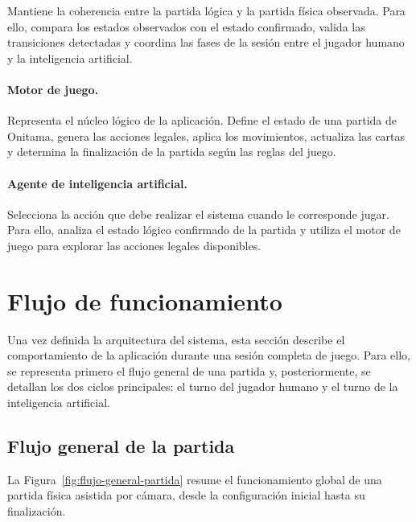 Mantiene la coherencia entre la partida lógica y la partida física observada. Para ello, compara los estados observados con el estado confirmado, valida las transiciones detectadas y coordina las fases de la sesión entre el jugador humano y la inteligencia artificial.

\paragraph{Motor de juego.}

Representa el núcleo lógico de la aplicación. Define el estado de una partida de Onitama, genera las acciones legales, aplica los movimientos, actualiza las cartas y determina la finalización de la partida según las reglas del juego.

\paragraph{Agente de inteligencia artificial.}

Selecciona la acción que debe realizar el sistema cuando le corresponde jugar. Para ello, analiza el estado lógico confirmado de la partida y utiliza el motor de juego para explorar las acciones legales disponibles.


\section{Flujo de funcionamiento}
\label{sec:flujo-funcionamiento}

Una vez definida la arquitectura del sistema, esta sección describe el comportamiento de la aplicación durante una sesión completa de juego. Para ello, se representa primero el flujo general de una partida y, posteriormente, se detallan los dos ciclos principales: el turno del jugador humano y el turno de la inteligencia artificial.

\subsection{Flujo general de la partida}

La Figura~\ref{fig:flujo-general-partida} resume el funcionamiento global de una partida física asistida por cámara, desde la configuración inicial hasta su finalización.

